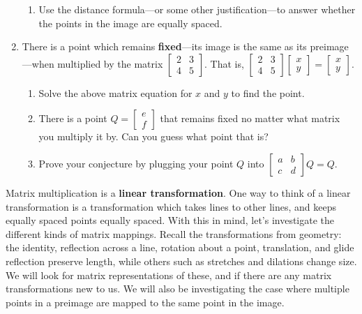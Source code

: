 \documentclass[../textbook.tex]{subfiles}
\begin{document}
\begin{enumerate}
\begin{enumerate}
\item Use the distance formula---or some other justification---to answer whether the points in the image are equally spaced.
\end{enumerate}
\item There is a point which remains \textbf{fixed}---its image is the same as its preimage---when multiplied by the matrix $\left[\begin{array}{cc}2 & 3 \\ 4 & 5 \end{array}\right]$. That is, $\left[\begin{array}{cc}2 & 3 \\ 4 & 5 \end{array}\right]\left[\begin{array}{c} x \\ y \end{array}\right]=\left[\begin{array}{c} x \\ y \end{array}\right]$.
\begin{enumerate}
\item Solve the above matrix equation for $x$ and $y$ to find the point.
\item There is a point $Q=\left[\begin{array}{c}e \\ f \end{array}\right]$ that remains fixed no matter what matrix you multiply it by. Can you guess what point that is?
\item Prove your conjecture by plugging your point $Q$ into $\left[\begin{array}{cc}a & b \\ c & d\end{array}\right]Q=Q$.
\end{enumerate}
\setcounter{problem_i}{\value{enumi}}
\end{enumerate}

\noindent Matrix multiplication is a \textbf{linear transformation}. One way to think of a linear transformation is a transformation which takes lines to other lines, and keeps equally spaced points equally spaced. With this in mind, let's investigate the different kinds of matrix mappings. Recall the transformations from geometry: the identity, reflection across a line, rotation about a point, translation, and glide reflection preserve length, while others such as stretches and dilations change size. We will look for matrix representations of these, and if there are any matrix transformations new to us. We will also be investigating the case where multiple points in a preimage are mapped to the same point in the image.
\end{document}
